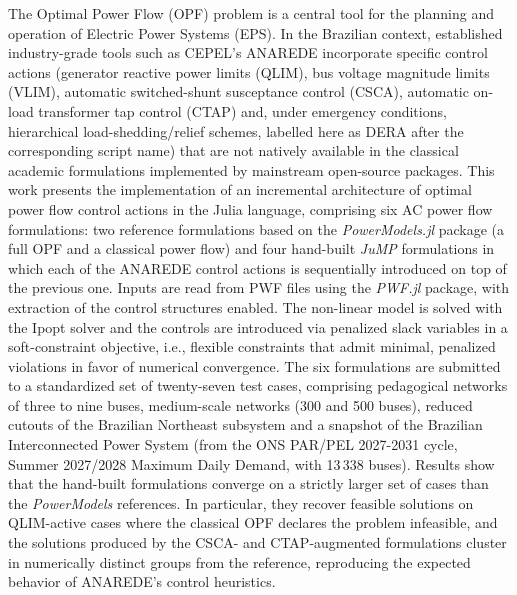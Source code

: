 The Optimal Power Flow (OPF) problem is a central tool for the planning and operation of Electric Power Systems (EPS). In the Brazilian context, established industry-grade tools such as CEPEL's ANAREDE incorporate specific control actions (generator reactive power limits (QLIM), bus voltage magnitude limits (VLIM), automatic switched-shunt susceptance control (CSCA), automatic on-load transformer tap control (CTAP) and, under emergency conditions, hierarchical load-shedding/relief schemes, labelled here as DERA after the corresponding script name) that are not natively available in the classical academic formulations implemented by mainstream open-source packages. This work presents the implementation of an incremental architecture of optimal power flow control actions in the Julia language, comprising six AC power flow formulations: two reference formulations based on the \textit{PowerModels.jl} package (a full OPF and a classical power flow) and four hand-built \textit{JuMP} formulations in which each of the ANAREDE control actions is sequentially introduced on top of the previous one. Inputs are read from PWF files using the \textit{PWF.jl} package, with extraction of the control structures enabled. The non-linear model is solved with the Ipopt solver and the controls are introduced via penalized slack variables in a soft-constraint objective, i.e., flexible constraints that admit minimal, penalized violations in favor of numerical convergence. The six formulations are submitted to a standardized set of twenty-seven test cases, comprising pedagogical networks of three to nine buses, medium-scale networks (300 and 500 buses), reduced cutouts of the Brazilian Northeast subsystem and a snapshot of the Brazilian Interconnected Power System (from the ONS PAR/PEL 2027-2031 cycle, Summer 2027/2028 Maximum Daily Demand, with 13\,338 buses). Results show that the hand-built formulations converge on a strictly larger set of cases than the \textit{PowerModels} references. In particular, they recover feasible solutions on QLIM-active cases where the classical OPF declares the problem infeasible, and the solutions produced by the CSCA- and CTAP-augmented formulations cluster in numerically distinct groups from the reference, reproducing the expected behavior of ANAREDE's control heuristics.

